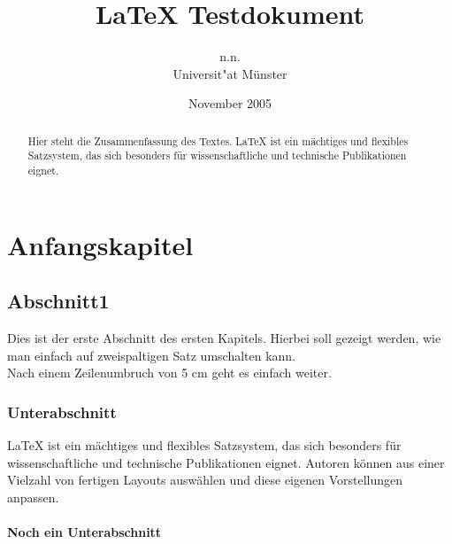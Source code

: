 \documentclass[a4paper,onecolumn,draft,pdftex]{report}
\begin{document}
\author{n.n. \\
Universit"at Münster}
\title{\LaTeX{} Testdokument}
\date{November 2005}
\setcounter{secnumdepth}{3}
\maketitle


\begin{abstract}
Hier steht die Zusammenfassung des Textes. LaTeX ist ein m\"achtiges und flexibles Satzsystem, das sich besonders f\"ur
wissenschaftliche und technische Publikationen eignet.
\end{abstract}


\chapter{Anfangskapitel}
\section{Abschnitt1}
Dies ist der erste Abschnitt des ersten Kapitels. Hierbei soll gezeigt werden,
wie man einfach auf zweispaltigen Satz umschalten kann.\\[4cm]
Nach einem Zeilenumbruch von 5 cm geht es einfach weiter.
\subsection{Unterabschnitt}

LaTeX ist ein m\"achtiges und flexibles Satzsystem, das sich besonders f\"ur
wissenschaftliche und technische Publikationen eignet. Autoren k\"onnen
aus einer Vielzahl von fertigen Layouts ausw\"ahlen und diese eigenen 
Vorstellungen anpassen. 
\subsubsection{Noch ein Unterabschnitt}
\end{document}
